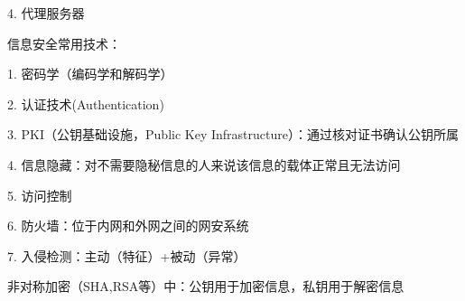 4. 代理服务器

\begin{notation}
    信息安全常用技术：

    1. 密码学（编码学和解码学）

    2. 认证技术(Authentication)

    3. PKI（公钥基础设施，Public Key Infrastructure）：通过核对证书确认公钥所属

    4. 信息隐藏：对不需要隐秘信息的人来说该信息的载体正常且无法访问

    5. 访问控制

    6. 防火墙：位于内网和外网之间的网安系统

    7. 入侵检测：主动（特征）+被动（异常）
\end{notation}
\begin{notation}
    非对称加密（SHA,RSA等）中：公钥用于加密信息，私钥用于解密信息
\end{notation}












































